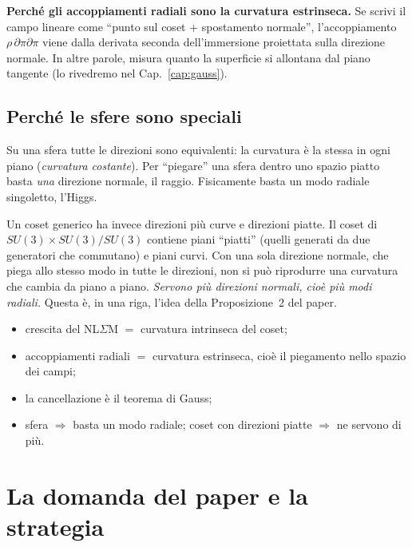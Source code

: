 \documentclass[11pt,a4paper]{article}
\numberwithin{equation}{section}
\theoremstyle{remark}
\begin{document}
\textbf{Perché gli accoppiamenti radiali sono la curvatura estrinseca.} Se scrivi il campo lineare come ``punto sul coset + spostamento normale'', l'accoppiamento $\rho\,\partial\pi\partial\pi$ viene dalla derivata seconda dell'immersione proiettata sulla direzione normale. In altre parole, misura quanto la superficie si allontana dal piano tangente (lo rivedremo nel Cap.~\ref{cap:gauss}).

\subsection{Perché le sfere sono speciali}

Su una sfera tutte le direzioni sono equivalenti: la curvatura è la stessa in ogni piano (\emph{curvatura costante}). Per ``piegare'' una sfera dentro uno spazio piatto basta \emph{una} direzione normale, il raggio. Fisicamente basta un modo radiale singoletto, l'Higgs.

Un coset generico ha invece direzioni più curve e direzioni piatte. Il coset di $SU(3)\times SU(3)/SU(3)$ contiene piani ``piatti'' (quelli generati da due generatori che commutano) e piani curvi. Con una sola direzione normale, che piega allo stesso modo in tutte le direzioni, non si può riprodurre una curvatura che cambia da piano a piano. \emph{Servono più direzioni normali, cioè più modi radiali.} Questa è, in una riga, l'idea della Proposizione~2 del paper.

\begin{porta}
\begin{itemize}[nosep]
\item crescita del NL$\Sigma$M $=$ curvatura intrinseca del coset;
\item accoppiamenti radiali $=$ curvatura estrinseca, cioè il piegamento nello spazio dei campi;
\item la cancellazione è il teorema di Gauss;
\item sfera $\Rightarrow$ basta un modo radiale; coset con direzioni piatte $\Rightarrow$ ne servono di più.
\end{itemize}
\end{porta}

\section{La domanda del paper e la strategia}
\label{cap:domanda}
\end{document}
